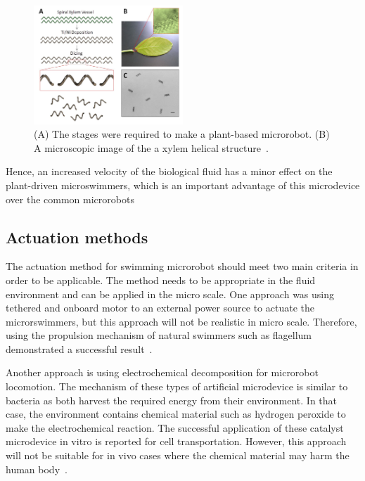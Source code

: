 \documentclass[12pt,a4paper,titlepage]{report}
\newcommand{\hilight}[1]{\colorbox{yellow}{#1}}
\begin{document}
\begin{figure}
  \begin{center}
    \includegraphics[width=0.5\textwidth]{plants2}
  \caption[plant-based microrobot]{(A) The stages were required to make a plant-based microrobot. (B) A microscopic image of the 
a xylem helical structure~\citep{gao2013bioinspired}.}
  \label{plants2}
\end{center}
\end{figure}







 Hence, an increased velocity of the 
biological fluid has a minor effect on the plant-driven microswimmers, which is an important 
advantage of this microdevice over the common microrobots%




\subsection{Actuation methods} \label{actuation}

The actuation method for swimming microrobot should meet two main criteria in order to be 
applicable. The method needs to be appropriate in the fluid environment and can be applied 
in the micro scale. One approach was using tethered and onboard motor to an external power
 source to actuate the microrswimmers, but this approach will not be realistic in micro scale. 
Therefore, using the propulsion mechanism of natural swimmers such as flagellum demonstrated 
a successful result~\citep{peyer2013bio}.

Another approach is using electrochemical decomposition for microrobot locomotion. 
The mechanism of these types of artificial microdevice is similar to bacteria as both harvest the 
required energy from their environment. In that case, the environment contains chemical material such 
as hydrogen peroxide to make the electrochemical reaction. The successful application of these catalyst 
microdevice in vitro is reported for cell transportation. However, this approach will not be suitable for in vivo 
cases where the chemical material may harm the human body~\citep{peyer2013bio}.   
\end{document}
